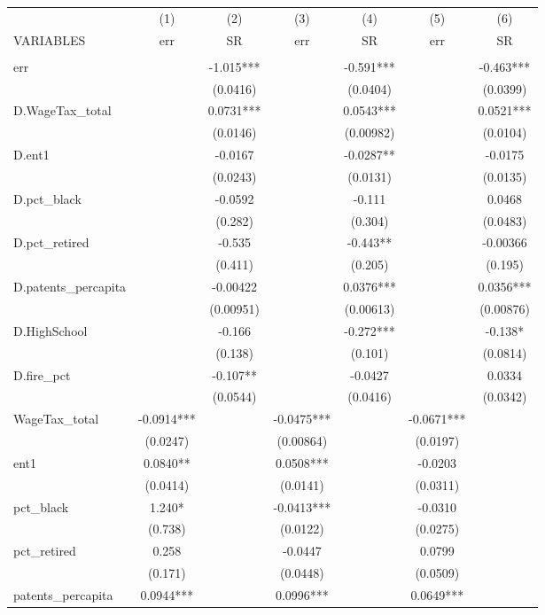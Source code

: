 \begin{tabular}{lcccccc} \hline
 & (1) & (2) & (3) & (4) & (5) & (6) \\
VARIABLES & err & SR & err & SR & err & SR \\ \hline
 &  &  &  &  &  &  \\
err &  & -1.015*** &  & -0.591*** &  & -0.463*** \\
 &  & (0.0416) &  & (0.0404) &  & (0.0399) \\
D.WageTax\_total &  & 0.0731*** &  & 0.0543*** &  & 0.0521*** \\
 &  & (0.0146) &  & (0.00982) &  & (0.0104) \\
D.ent1 &  & -0.0167 &  & -0.0287** &  & -0.0175 \\
 &  & (0.0243) &  & (0.0131) &  & (0.0135) \\
D.pct\_black &  & -0.0592 &  & -0.111 &  & 0.0468 \\
 &  & (0.282) &  & (0.304) &  & (0.0483) \\
D.pct\_retired &  & -0.535 &  & -0.443** &  & -0.00366 \\
 &  & (0.411) &  & (0.205) &  & (0.195) \\
D.patents\_percapita &  & -0.00422 &  & 0.0376*** &  & 0.0356*** \\
 &  & (0.00951) &  & (0.00613) &  & (0.00876) \\
D.HighSchool &  & -0.166 &  & -0.272*** &  & -0.138* \\
 &  & (0.138) &  & (0.101) &  & (0.0814) \\
D.fire\_pct &  & -0.107** &  & -0.0427 &  & 0.0334 \\
 &  & (0.0544) &  & (0.0416) &  & (0.0342) \\
WageTax\_total & -0.0914*** &  & -0.0475*** &  & -0.0671*** &  \\
 & (0.0247) &  & (0.00864) &  & (0.0197) &  \\
ent1 & 0.0840** &  & 0.0508*** &  & -0.0203 &  \\
 & (0.0414) &  & (0.0141) &  & (0.0311) &  \\
pct\_black & 1.240* &  & -0.0413*** &  & -0.0310 &  \\
 & (0.738) &  & (0.0122) &  & (0.0275) &  \\
pct\_retired & 0.258 &  & -0.0447 &  & 0.0799 &  \\
 & (0.171) &  & (0.0448) &  & (0.0509) &  \\
patents\_percapita & 0.0944*** &  & 0.0996*** &  & 0.0649*** &  \\

\end{tabular}
